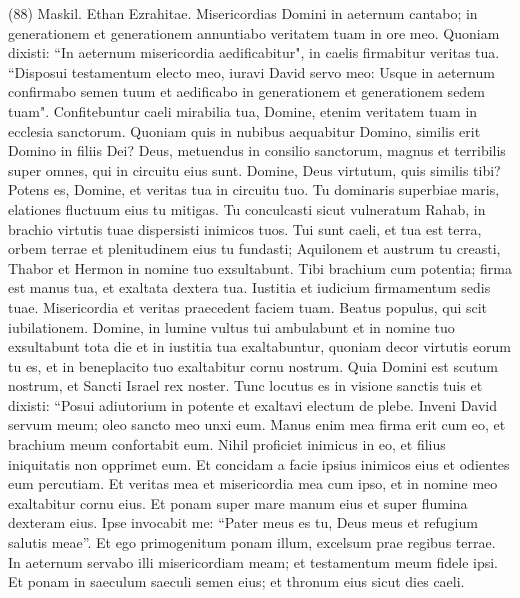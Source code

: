 \begin{biblechapter}  (88) 
\verse  Maskil. Ethan Ezrahitae. 
\verse Misericordias Domini in aeternum cantabo; in generationem et generationem annuntiabo veritatem tuam in ore meo. 
\verse Quoniam dixisti: “In aeternum misericordia aedificabitur", in caelis firmabitur veritas tua. 
\verse “Disposui testamentum electo meo, iuravi David servo meo: 
\verse Usque in aeternum confirmabo semen tuum et aedificabo in generationem et generationem sedem tuam". 
\verse Confitebuntur caeli mirabilia tua, Domine, etenim veritatem tuam in ecclesia sanctorum. 
\verse Quoniam quis in nubibus aequabitur Domino, similis erit Domino in filiis Dei? 
\verse Deus, metuendus in consilio sanctorum, magnus et terribilis super omnes, qui in circuitu eius sunt. 
\verse Domine, Deus virtutum, quis similis tibi? Potens es, Domine, et veritas tua in circuitu tuo. 
\verse Tu dominaris superbiae maris, elationes fluctuum eius tu mitigas. 
\verse Tu conculcasti sicut vulneratum Rahab, in brachio virtutis tuae dispersisti inimicos tuos. 
\verse Tui sunt caeli, et tua est terra, orbem terrae et plenitudinem eius tu fundasti; 
\verse Aquilonem et austrum tu creasti, Thabor et Hermon in nomine tuo exsultabunt. 
\verse Tibi brachium cum potentia; firma est manus tua, et exaltata dextera tua. 
\verse Iustitia et iudicium firmamentum sedis tuae. Misericordia et veritas praecedent faciem tuam. 
\verse Beatus populus, qui scit iubilationem. Domine, in lumine vultus tui ambulabunt 
\verse et in nomine tuo exsultabunt tota die et in iustitia tua exaltabuntur, 
\verse quoniam decor virtutis eorum tu es, et in beneplacito tuo exaltabitur cornu nostrum. 
\verse Quia Domini est scutum nostrum, et Sancti Israel rex noster. 
\verse Tunc locutus es in visione sanctis tuis et dixisti: “Posui adiutorium in potente et exaltavi electum de plebe. 
\verse Inveni David servum meum; oleo sancto meo unxi eum. 
\verse Manus enim mea firma erit cum eo, et brachium meum confortabit eum. 
\verse Nihil proficiet inimicus in eo, et filius iniquitatis non opprimet eum. 
\verse Et concidam a facie ipsius inimicos eius et odientes eum percutiam. 
\verse Et veritas mea et misericordia mea cum ipso, et in nomine meo exaltabitur cornu eius. 
\verse Et ponam super mare manum eius et super flumina dexteram eius. 
\verse Ipse invocabit me: “Pater meus es tu, Deus meus et refugium salutis meae”. 
\verse Et ego primogenitum ponam illum, excelsum prae regibus terrae. 
\verse In aeternum servabo illi misericordiam meam; et testamentum meum fidele ipsi. 
\verse Et ponam in saeculum saeculi semen eius; et thronum eius sicut dies caeli. 

\end{biblechapter}

